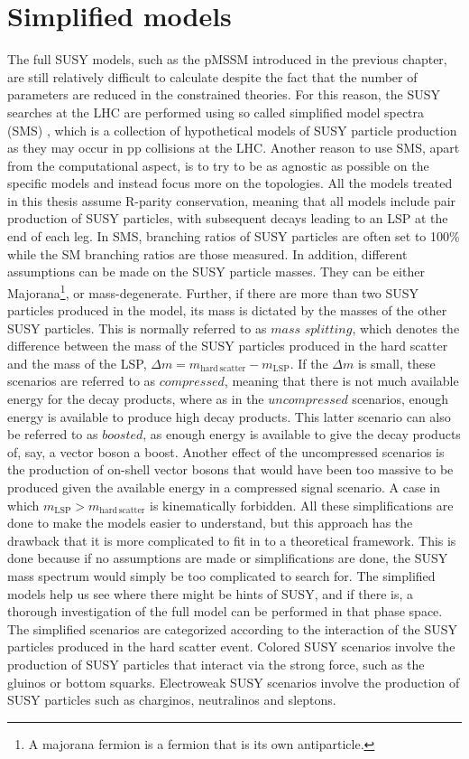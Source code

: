 \section{Simplified models}
\noindent\justify
The full SUSY models, such as the pMSSM introduced in the previous chapter, are still relatively difficult to calculate despite the fact that the number of parameters are reduced in the constrained theories.  
For this reason, the SUSY searches at the LHC are performed using so called simplified model spectra (SMS) \cite{Alwall:2008ag,Alves:2011wf}, which is a collection of hypothetical models of SUSY particle production as they may occur in pp collisions at the LHC.
Another reason to use SMS, apart from the computational aspect, is to try to be as agnostic as possible on the specific models and instead focus more on the topologies. 
All the models treated in this thesis assume R-parity conservation, meaning that all models include pair production of SUSY particles, with subsequent decays leading to an LSP at the end of each leg.
\newpara
\noindent\justify
In SMS, branching ratios of SUSY particles are often set to 100\% while the SM branching ratios are those measured. 
In addition, different assumptions can be made on the SUSY particle masses. They can be either Majorana\footnote{A majorana fermion is a fermion that is its own antiparticle.}, or mass-degenerate. 
Further, if there are more than two SUSY particles produced in the model, its mass is dictated by the masses of the other SUSY particles. 
This is normally referred to as $mass$ $splitting$, which denotes the difference between the mass of the SUSY particles produced in the hard scatter and the mass of the LSP, $\Delta m = m_{\mathrm{hard\,scatter}}-m_{\mathrm{LSP}}$.
If the $\Delta m$ is small, these scenarios are referred to as $compressed$, meaning that there is not much available energy for the decay products, where as in the $uncompressed$ scenarios, enough energy is available to produce high \pt decay products. 
This latter scenario can also be referred to as $boosted$, as enough energy is available to give the decay products of, say, a vector boson a boost.   
Another effect of the uncompressed scenarios is the production of on-shell vector bosons that would have been too massive to be produced given the available energy in a compressed signal scenario. 
A case in which $m_{\mathrm{LSP}}>m_{\mathrm{hard\,scatter}}$ is kinematically forbidden.  
\newpara
\noindent\justify
All these simplifications are done to make the models easier to understand, but this approach has the drawback that it is more complicated to fit in to a theoretical framework.
This is done because if no assumptions are made or simplifications are done, the SUSY mass spectrum would simply be too complicated to search for. 
The simplified models help us see where there might be hints of SUSY, and if there is, a thorough investigation of the full model can be performed in that phase space. 
The simplified scenarios are categorized according to the interaction of the SUSY particles produced in the  hard scatter event. 
Colored SUSY scenarios involve the production of SUSY particles that interact via the strong force, such as the gluinos or bottom squarks. 
Electroweak SUSY scenarios involve the production of SUSY particles such as charginos, neutralinos and sleptons. 
